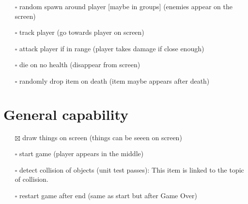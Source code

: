 \documentclass[
]{article}
\providecommand{\tightlist}{%
  \setlength{\itemsep}{0pt}\setlength{\parskip}{0pt}}
\begin{document}
\begin{itemize}
\tightlist
\item[$\square$]
  random spawn around player {[}maybe in groups{]} (enemies appear on
  the screen)
\item[$\square$]
  track player (go towards player on screen)
\item[$\square$]
  attack player if in range (player takes damage if close enough)
\item[$\square$]
  die on no health (disappear from screen)
\item[$\square$]
  randomly drop item on death (item maybe appears after death)
\end{itemize}

\section{General capability}\label{general-capability}

\begin{itemize}
\tightlist
\item[$\boxtimes$]
  draw things on screen (things can be seeen on screen)
\item[$\square$]
  start game (player appears in the middle)
\item[$\square$]
  detect collision of objects (unit test passes): This item is linked to the topic of collision. 
\item[$\square$]
  restart game after end (same as start but after Game Over)
\end{itemize}
\end{document}
